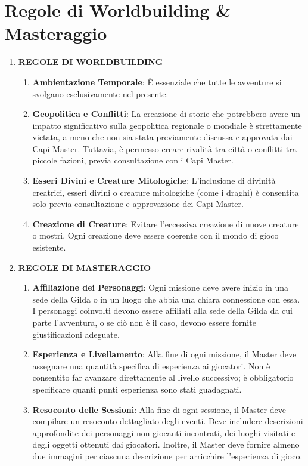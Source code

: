 \section{Regole di Worldbuilding \&
Masteraggio}\label{regole-di-worldbuilding-masteraggio}

\begin{enumerate}
\def\labelenumi{\arabic{enumi}.}
\tightlist
\item
  \textbf{REGOLE DI WORLDBUILDING}

  \begin{enumerate}
  \def\labelenumii{\arabic{enumii}.}
  \tightlist
  \item
    \textbf{Ambientazione Temporale}: È essenziale che tutte le
    avventure si svolgano esclusivamente nel presente.
  \item
    \textbf{Geopolitica e Conflitti}: La creazione di storie che
    potrebbero avere un impatto significativo sulla geopolitica
    regionale o mondiale è strettamente vietata, a meno che non sia
    stata previamente discussa e approvata dai Capi Master. Tuttavia, è
    permesso creare rivalità tra città o conflitti tra piccole fazioni,
    previa consultazione con i Capi Master.
  \item
    \textbf{Esseri Divini e Creature Mitologiche}: L'inclusione di
    divinità creatrici, esseri divini o creature mitologiche (come i
    draghi) è consentita solo previa consultazione e approvazione dei
    Capi Master.
  \item
    \textbf{Creazione di Creature}: Evitare l'eccessiva creazione di
    nuove creature o mostri. Ogni creazione deve essere coerente con il
    mondo di gioco esistente.
  \end{enumerate}
\item
  \textbf{REGOLE DI MASTERAGGIO}

  \begin{enumerate}
  \def\labelenumii{\arabic{enumii}.}
  \tightlist
  \item
    \textbf{Affiliazione dei Personaggi}: Ogni missione deve avere
    inizio in una sede della Gilda o in un luogo che abbia una chiara
    connessione con essa. I personaggi coinvolti devono essere affiliati
    alla sede della Gilda da cui parte l'avventura, o se ciò non è il
    caso, devono essere fornite giustificazioni adeguate.
  \item
    \textbf{Esperienza e Livellamento}: Alla fine di ogni missione, il
    Master deve assegnare una quantità specifica di esperienza ai
    giocatori. Non è consentito far avanzare direttamente al livello
    successivo; è obbligatorio specificare quanti punti esperienza sono
    stati guadagnati.
  \item
    \textbf{Resoconto delle Sessioni}: Alla fine di ogni sessione, il
    Master deve compilare un resoconto dettagliato degli eventi. Deve
    includere descrizioni approfondite dei personaggi non giocanti
    incontrati, dei luoghi visitati e degli oggetti ottenuti dai
    giocatori. Inoltre, il Master deve fornire almeno due immagini per
    ciascuna descrizione per arricchire l'esperienza di gioco.
  \end{enumerate}
\end{enumerate}
